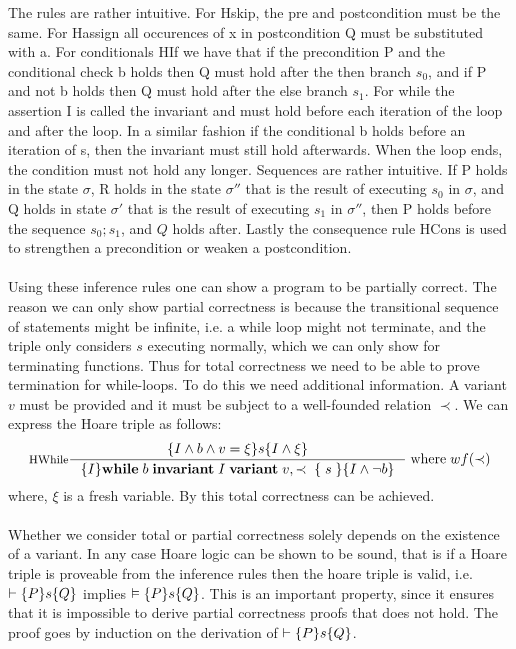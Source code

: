 The rules are rather intuitive.
For Hskip, the pre and postcondition must be the same.
For Hassign all occurences of x in postcondition Q must be substituted with a.
For conditionals HIf we have that if the precondition P and the conditional check b holds then Q must hold after the then branch $s_{0}$, and if P and not b holds then Q must hold after the else branch $s_1$.
For while the assertion I is called the invariant and must hold before each iteration of the loop and after the loop.
In a similar fashion if the conditional b holds before an iteration of s, then the invariant must still hold afterwards.
When the loop ends, the condition must not hold any longer.
Sequences are rather intuitive. If P holds in the state $\sigma$, R holds in the state $\sigma''$ that
is the result of executing $s_{0}$ in $\sigma$, and Q holds in state $\sigma'$ that is the result of
executing $s_{1}$ in $\sigma''$, then P holds before the sequence $s_{0}; s_{1}$, and $Q$ holds after.
Lastly the consequence rule HCons is used to strengthen a precondition or weaken a postcondition.
\\~\\
Using these inference rules one can show a program to be partially correct.
The reason we can only show partial correctness is because the transitional sequence of statements might be infinite, i.e. a while loop might not terminate, and the triple only considers $s$ executing normally, which we can only show for terminating functions.
Thus for total correctness we need to be able to prove termination for while-loops.
To do this we need additional information.
A variant $v$ must be provided and it must
be subject to a well-founded relation $\prec$.
We can express the Hoare triple as follows:
\[
\inference[HWhile]{\hoare{I \wedge b \wedge v = \xi }{s}{I \wedge \xi}}
{\hoare{I}{ \mathbf{while} \; b \; \mathbf{invariant} \; I \; \mathbf{variant} \; v, \prec \; \{ \; s \; \} }{I \wedge \neg b}} \; \text{where} \; wf(\prec)
\]
where, $\xi$ is a fresh variable.
By this total correctness can be achieved.
\\~\\
Whether we consider total or partial correctness solely depends on the existence of a variant.
In any case Hoare logic can be shown to be sound, that is if a Hoare triple is proveable from the inference rules then the hoare triple is valid, i.e. $\vdash \{P\}s\{Q\}$ implies $\vDash \{P\}s\{Q\}$.
This is an important property, since it ensures that it is impossible to derive partial correctness proofs that does not hold.
The proof goes by induction on the derivation of $\vdash \{P\}s\{Q\}$.
